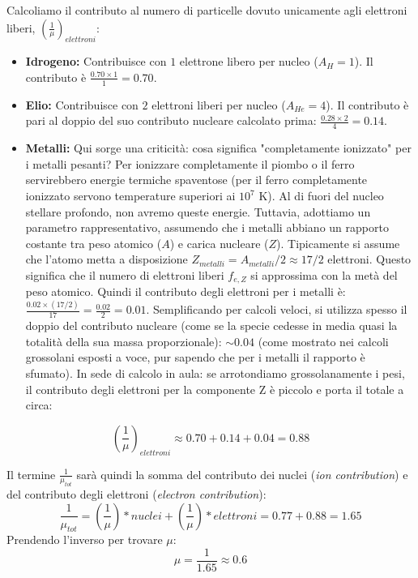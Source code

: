 Calcoliamo il contributo al numero di particelle dovuto unicamente agli elettroni liberi, $\left(\frac{1}{\mu}\right)_{elettroni}$:
\begin{itemize}
\item \textbf{Idrogeno:} Contribuisce con $1$ elettrone libero per nucleo ($A_H=1$). Il contributo è $\frac{0.70 \times 1}{1} = 0.70$.
\item \textbf{Elio:} Contribuisce con $2$ elettroni liberi per nucleo ($A_{He}=4$). Il contributo è pari al doppio del suo contributo nucleare calcolato prima: $\frac{0.28 \times 2}{4} = 0.14$.
\item \textbf{Metalli:} Qui sorge una criticità: cosa significa "completamente ionizzato" per i metalli pesanti? Per ionizzare completamente il piombo o il ferro servirebbero energie termiche spaventose (per il ferro completamente ionizzato servono temperature superiori ai $10^7$ K). Al di fuori del nucleo stellare profondo, non avremo queste energie. Tuttavia, adottiamo un parametro rappresentativo, assumendo che i metalli abbiano un rapporto costante tra peso atomico ($A$) e carica nucleare ($Z$). Tipicamente si assume che l'atomo metta a disposizione $Z_{metalli} = A_{metalli}/2 \approx 17/2$ elettroni. Questo significa che il numero di elettroni liberi $f_{e, Z}$ si approssima con la metà del peso atomico. Quindi il contributo degli elettroni per i metalli è: $\frac{0.02 \times (17/2)}{17} = \frac{0.02}{2} = 0.01$. Semplificando per calcoli veloci, si utilizza spesso il doppio del contributo nucleare (come se la specie cedesse in media quasi la totalità della sua massa proporzionale): $\sim 0.04$ (come mostrato nei calcoli grossolani esposti a voce, pur sapendo che per i metalli il rapporto è sfumato).
In sede di calcolo in aula: se arrotondiamo grossolanamente i pesi, il contributo degli elettroni per la componente Z è piccolo e porta il totale a circa:
\end{itemize}
\begin{equation}
\left(\frac{1}{\mu}\right)_{elettroni} \approx 0.70 + 0.14 + 0.04 = 0.88
\end{equation}

Il termine $\frac{1}{\mu_{tot}}$ sarà quindi la somma del contributo dei nuclei (\textit{ion contribution}) e del contributo degli elettroni (\textit{electron contribution}):
\begin{equation}
\frac{1}{\mu_{tot}} = \left(\frac{1}{\mu}\right)*{nuclei} + \left(\frac{1}{\mu}\right)*{elettroni} = 0.77 + 0.88 = 1.65
\end{equation}
Prendendo l'inverso per trovare $\mu$:
\begin{equation}
\mu = \frac{1}{1.65} \approx 0.6
\end{equation}

